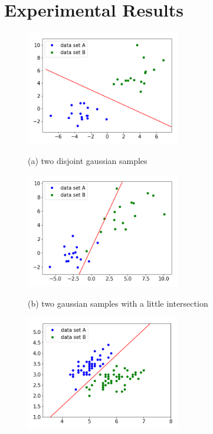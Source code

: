 \documentclass{article}
\begin{document}
\section{Experimental Results}
\label{experiment}
\begin{figure}[h]
	\begin{minipage}[h]{1.0\linewidth}
        \centering
        \includegraphics[width=0.6\textwidth]{gaussian_without_noise.png}
		\centerline{(a) two disjoint gaussian samples}\medskip
	\end{minipage}
	\begin{minipage}[h]{1.0\linewidth}
        \centering
        \includegraphics[width=0.6\textwidth]{gaussian_with_noise.png}
		\centerline{(b) two gaussian samples with a little intersection}\medskip
	\end{minipage}
	\hfill
	\begin{minipage}[h]{1.0\linewidth}
        \centering
        \includegraphics[width=0.6\textwidth]{another_data_set.png}

\end{minipage}
\end{figure}
\end{document}
